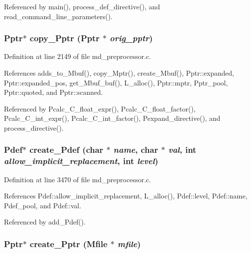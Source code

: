 Referenced by main(), process\_\-def\_\-directive(), and read\_\-command\_\-line\_\-parameters().
\subsubsection{\setlength{\rightskip}{0pt plus 5cm}\bf{Pptr}$\ast$ copy\_\-Pptr (\bf{Pptr} $\ast$ {\em orig\_\-pptr})}\label{md__preprocessor_8h_f0da883268c1e42b311b6d8673f6206e}




Definition at line 2149 of file md\_\-preprocessor.c.

References adds\_\-to\_\-Mbuf(), copy\_\-Mptr(), create\_\-Mbuf(), Pptr::expanded, Pptr::expanded\_\-pos, get\_\-Mbuf\_\-buf(), L\_\-alloc(), Pptr::mptr, Pptr\_\-pool, Pptr::quoted, and Pptr::scanned.

Referenced by Pcalc\_\-C\_\-float\_\-expr(), Pcalc\_\-C\_\-float\_\-factor(), Pcalc\_\-C\_\-int\_\-expr(), Pcalc\_\-C\_\-int\_\-factor(), Pexpand\_\-directive(), and process\_\-directive().
\subsubsection{\setlength{\rightskip}{0pt plus 5cm}\bf{Pdef}$\ast$ create\_\-Pdef (char $\ast$ {\em name}, char $\ast$ {\em val}, int {\em allow\_\-implicit\_\-replacement}, int {\em level})}\label{md__preprocessor_8h_cf9d96a6259b42e99198e03a423214d7}




Definition at line 3470 of file md\_\-preprocessor.c.

References Pdef::allow\_\-implicit\_\-replacement, L\_\-alloc(), Pdef::level, Pdef::name, Pdef\_\-pool, and Pdef::val.

Referenced by add\_\-Pdef().
\subsubsection{\setlength{\rightskip}{0pt plus 5cm}\bf{Pptr}$\ast$ create\_\-Pptr (\bf{Mfile} $\ast$ {\em mfile})}\label{md__preprocessor_8h_03c35a85124487f604fced1fd4cb1413}





